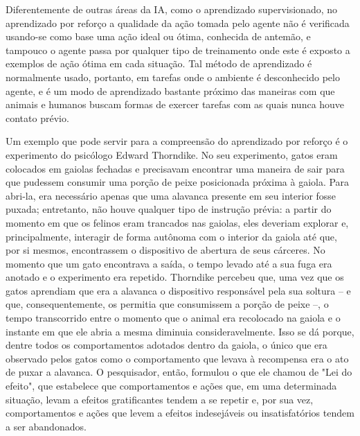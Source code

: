 \documentclass[cic,tc]{iiufrgs}
\begin{document}
    
    Diferentemente de outras áreas da IA, como o aprendizado supervisionado, no aprendizado por reforço a qualidade da ação tomada pelo agente não
    é verificada usando-se como base uma ação ideal ou ótima,  conhecida de antemão, e tampouco o agente passa por qualquer tipo de treinamento onde este é exposto a
    exemplos de ação ótima em cada situação. Tal método de aprendizado é normalmente usado, portanto, em tarefas onde o ambiente é desconhecido
    pelo agente, e é um modo de aprendizado bastante próximo das maneiras com que
    animais e humanos buscam formas de exercer tarefas com as quais nunca houve contato prévio. \par
    Um exemplo que pode servir para a compreensão do aprendizado por reforço é o experimento do psicólogo Edward Thorndike.
    No seu experimento, gatos eram colocados em gaiolas fechadas e precisavam encontrar uma maneira de sair para que pudessem
    consumir uma porção de peixe posicionada próxima à gaiola. Para abri-la, era necessário apenas que uma alavanca presente em
    seu interior fosse puxada; entretanto, não houve qualquer tipo de instrução prévia: a partir do momento em que os felinos
    eram trancados nas gaiolas, eles deveriam explorar e, principalmente, interagir de forma autônoma com o interior da gaiola até que, por si mesmos,
    encontrassem o dispositivo de abertura de seus cárceres. No momento que um gato encontrava a saída, o tempo levado até a sua fuga era anotado
     e o experimento era repetido.
    Thorndike percebeu que, uma vez que os gatos aprendiam que era a alavanca o dispositivo responsável pela sua
    soltura – e que, consequentemente, os permitia que consumissem a porção de peixe –, o tempo transcorrido entre o momento
    que o animal era recolocado na gaiola e o instante em que ele abria a mesma diminuia consideravelmente. Isso se dá porque,
    dentre todos os comportamentos adotados dentro da gaiola, o único que era observado pelos gatos como o comportamento que
    levava à recompensa era o ato de puxar a alavanca. O pesquisador, então, formulou o que ele chamou de "Lei do efeito",
    que estabelece que comportamentos e ações que, em uma determinada situação, levam a efeitos gratificantes tendem a se
    repetir e, por sua vez, comportamentos e ações que levem a efeitos indesejáveis ou insatisfatórios tendem a ser abandonados.
    
    
\end{document}
